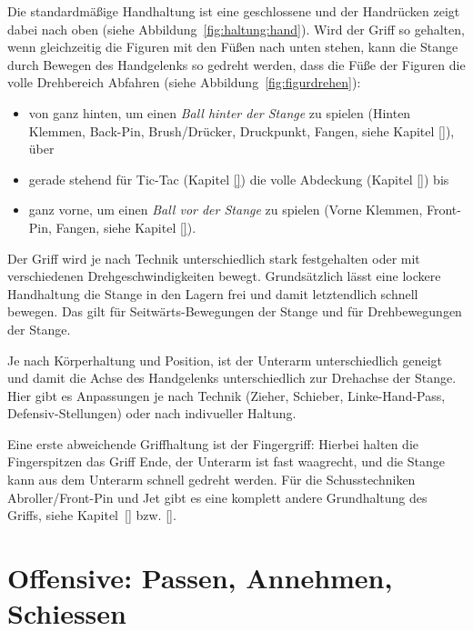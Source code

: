Die standardmäßige Handhaltung ist eine geschlossene
und der Handrücken zeigt dabei nach oben (siehe Abbildung~\ref{fig:haltung:hand}).
Wird der Griff so gehalten, wenn gleichzeitig die Figuren mit den Füßen nach unten stehen, kann die Stange durch Bewegen des Handgelenks so gedreht werden, dass die Füße der Figuren die volle Drehbereich Abfahren (siehe Abbildung~\ref{fig:figurdrehen}):
\begin{itemize}
    \item von ganz hinten, um einen \textit{Ball hinter der Stange} zu spielen (Hinten Klemmen, Back-Pin, Brush/Drücker, Druckpunkt, Fangen, siehe Kapitel \ref{}), über
    \item gerade stehend für Tic-Tac (Kapitel \ref{}) die volle Abdeckung (Kapitel \ref{}) bis 
    \item ganz vorne, um einen \textit{Ball vor der Stange} zu spielen (Vorne Klemmen, Front-Pin, Fangen, siehe Kapitel \ref{}).
\end{itemize}

Der Griff wird je nach Technik unterschiedlich stark festgehalten oder mit verschiedenen Drehgeschwindigkeiten bewegt. 
Grundsätzlich lässt  eine lockere Handhaltung die Stange in den Lagern frei und damit letztendlich schnell bewegen.
Das gilt für Seitwärts-Bewegungen der Stange und für Drehbewegungen der Stange.

Je nach Körperhaltung und Position, ist der Unterarm unterschiedlich geneigt und damit die Achse des Handgelenks unterschiedlich zur Drehachse der Stange.
Hier gibt es Anpassungen je nach Technik (Zieher, Schieber, Linke-Hand-Pass, Defensiv-Stellungen) oder nach indivueller Haltung.

Eine erste abweichende Griffhaltung ist der Fingergriff: Hierbei halten die Fingerspitzen das Griff Ende, der Unterarm ist fast waagrecht, und die Stange kann aus dem Unterarm schnell gedreht werden.
Für die Schusstechniken Abroller/Front-Pin und Jet gibt es eine komplett andere Grundhaltung des Griffs, siehe Kapitel~\ref{} bzw. \ref{}.


\section{Offensive: Passen, Annehmen, Schiessen}
\label{technik:offensive}

\begin{itemize}
\end{itemize}


